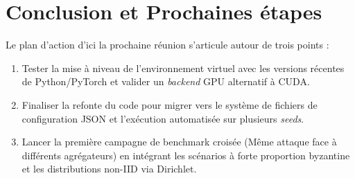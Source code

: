 \documentclass[11pt, a4paper]{article}
\begin{document}
\section{Conclusion et Prochaines étapes}
Le plan d'action d'ici la prochaine réunion s'articule autour de trois points :
\begin{enumerate}
    \item Tester la mise à niveau de l'environnement virtuel avec les versions récentes de Python/PyTorch et valider un \textit{backend} GPU alternatif à CUDA.
    \item Finaliser la refonte du code pour migrer vers le système de fichiers de configuration JSON et l'exécution automatisée sur plusieurs \textit{seeds}.
    \item Lancer la première campagne de benchmark croisée (Même attaque face à différents agrégateurs) en intégrant les scénarios à forte proportion byzantine et les distributions non-IID via Dirichlet.
\end{enumerate}
\end{document}
